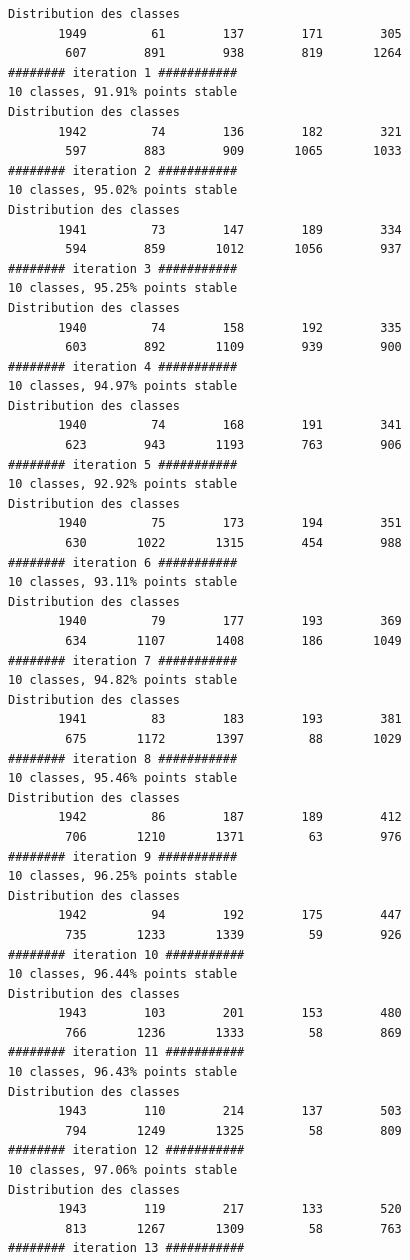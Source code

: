 \documentclass[land,article,submit,pdftex,moreauthors]{Definitions/mdpi}
\begin{document}
\begin{scriptsize}
\begin{verbatim}
Distribution des classes
       1949         61        137        171        305
        607        891        938        819       1264
######## iteration 1 ###########
10 classes, 91.91% points stable
Distribution des classes
       1942         74        136        182        321
        597        883        909       1065       1033
######## iteration 2 ###########
10 classes, 95.02% points stable
Distribution des classes
       1941         73        147        189        334
        594        859       1012       1056        937
######## iteration 3 ###########
10 classes, 95.25% points stable
Distribution des classes
       1940         74        158        192        335
        603        892       1109        939        900
######## iteration 4 ###########
10 classes, 94.97% points stable
Distribution des classes
       1940         74        168        191        341
        623        943       1193        763        906
######## iteration 5 ###########
10 classes, 92.92% points stable
Distribution des classes
       1940         75        173        194        351
        630       1022       1315        454        988
######## iteration 6 ###########
10 classes, 93.11% points stable
Distribution des classes
       1940         79        177        193        369
        634       1107       1408        186       1049
######## iteration 7 ###########
10 classes, 94.82% points stable
Distribution des classes
       1941         83        183        193        381
        675       1172       1397         88       1029
######## iteration 8 ###########
10 classes, 95.46% points stable
Distribution des classes
       1942         86        187        189        412
        706       1210       1371         63        976
######## iteration 9 ###########
10 classes, 96.25% points stable
Distribution des classes
       1942         94        192        175        447
        735       1233       1339         59        926
######## iteration 10 ###########
10 classes, 96.44% points stable
Distribution des classes
       1943        103        201        153        480
        766       1236       1333         58        869
######## iteration 11 ###########
10 classes, 96.43% points stable
Distribution des classes
       1943        110        214        137        503
        794       1249       1325         58        809
######## iteration 12 ###########
10 classes, 97.06% points stable
Distribution des classes
       1943        119        217        133        520
        813       1267       1309         58        763
######## iteration 13 ###########

\end{verbatim}
\end{scriptsize}
\end{document}
